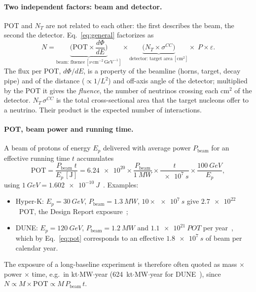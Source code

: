 \documentclass[11pt,a4paper]{article}
\newcommand{\POT}{\mathrm{POT}}
\begin{document}
\paragraph{Two independent factors: beam and detector.}
POT and $N_T$ are not related to each other: the first describes the beam, the second the detector.
Eq.~\eqref{eq:general} factorizes as
\begin{equation}
  N = \underbrace{\Big(\POT \times \frac{d\Phi}{dE}\Big)}_{\text{beam: fluence}\ [\nu\,\mathrm{cm^{-2}\,GeV^{-1}}]}
  \times
  \underbrace{\Big(N_T \times \sigma^{CC}\Big)}_{\text{detector: target area}\ [\mathrm{cm^2}]}
  \times\; P \times \varepsilon .
\end{equation}
The flux per POT, $d\Phi/dE$, is a property of the beamline (horns, target, decay pipe) and of the distance
($\propto 1/L^2$) and off-axis angle of the detector; multiplied by the POT it gives the \emph{fluence}, the number of
neutrinos crossing each cm$^2$ of the detector. $N_T\,\sigma^{CC}$ is the total cross-sectional area that the target
nucleons offer to a neutrino. Their product is the expected number of interactions.

\paragraph{POT, beam power and running time.}
A beam of protons of energy $E_p$ delivered with average power $P_\text{beam}$ for an effective running time $t$
accumulates
\begin{equation}
  \POT = \frac{P_\text{beam}\; t}{E_p\,[\mathrm{J}]}
  = \num{6.24e20}\times\frac{P_\text{beam}}{\SI{1}{MW}}\times\frac{t}{\SI{e7}{s}}\times\frac{\SI{100}{GeV}}{E_p} ,
  \label{eq:pot}
\end{equation}
using $\SI{1}{GeV} = \SI{1.602e-10}{J}$~\cite{CODATA2018}. Examples:
\begin{itemize}
  \item Hyper-K: $E_p=\SI{30}{GeV}$, $P_\text{beam}=\SI{1.3}{MW}$, $10\times\SI{e7}{s}$ give $\num{2.7e22}$~POT, the Design
        Report exposure~\cite{Hyper-Kamiokande:2018ofw};
  \item DUNE: $E_p=\SI{120}{GeV}$, $P_\text{beam}=\SI{1.2}{MW}$ and $\SI{1.1e21}{POT}$ per year~\cite{DUNE:2021cuw}, which by
        Eq.~\eqref{eq:pot} corresponds to an effective $\SI{1.8e7}{s}$ of beam per calendar year.
\end{itemize}
The exposure of a long-baseline experiment is therefore often quoted as mass $\times$ power $\times$ time, e.g.\ in
kt$\cdot$MW$\cdot$year (624~kt$\cdot$MW$\cdot$year for DUNE~\cite{DUNE:2021cuw}), since $N\propto M\times\POT\propto M\,P_\text{beam}\,t$.
\end{document}
